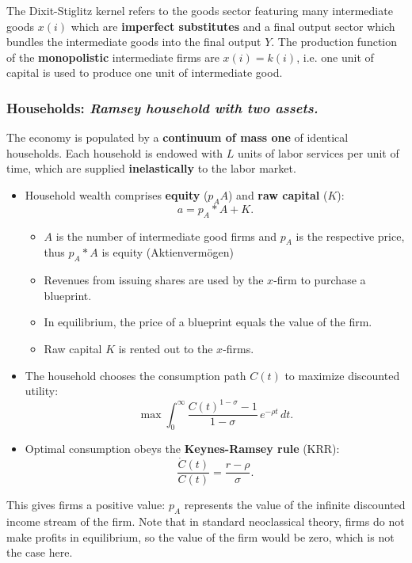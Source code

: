 \noindent The Dixit-Stiglitz kernel refers to the goods sector featuring many intermediate goods $x(i)$ which are \textbf{imperfect substitutes} and a final output sector which bundles the intermediate goods into the final output $Y$. The production function of the \textbf{monopolistic} intermediate firms are $x(i)=k(i)$, i.e. one unit of capital is used to produce one unit of intermediate good. 



\subsubsection{Households: \textit{Ramsey household with two assets.}}
The economy is populated by a \textbf{continuum of mass one} of identical households. Each household is endowed with $L$ units of labor services per unit of time, which are supplied \textbf{inelastically} to the labor market.
\begin{itemize}
    \item Household wealth comprises \textbf{equity} ($p_A A$) and \textbf{raw capital} ($K$):
    \[
        a = p_A* A + K.
    \]
    \begin{itemize}
        \item $A$ is the number of intermediate good firms and $p_A$ is the respective price, thus $p_A* A$ is equity (Aktienvermögen)
        \item Revenues from issuing shares are used by the $x$-firm to purchase a blueprint.
        \item In equilibrium, the price of a blueprint equals the value of the firm.
        \item Raw capital $K$ is rented out to the $x$-firms.
    \end{itemize}
    \item The household chooses the consumption path $C(t)$ to maximize discounted utility:
    \[
        \max \int_0^\infty \frac{C(t)^{1-\sigma}-1}{1-\sigma}\, e^{-\rho t}\, dt.
    \]
    \item Optimal consumption obeys the \textbf{Keynes-Ramsey rule} (KRR):
    \[
        \frac{\dot{C}(t)}{C(t)} = \frac{r-\rho}{\sigma}.
    \]
\end{itemize}


\begin{tcolorbox}[
    colback=blue!1!white, %
    colframe=blue!40!white, %
   title=The value of a firm, %
    fonttitle=\bfseries %
    ]

This gives firms a positive value: $p_A$ represents the value of the infinite discounted income stream of the firm. Note that in standard neoclassical theory, firms do not make profits in equilibrium, so the value of the firm would be zero, which is not the case here.

\end{tcolorbox}


